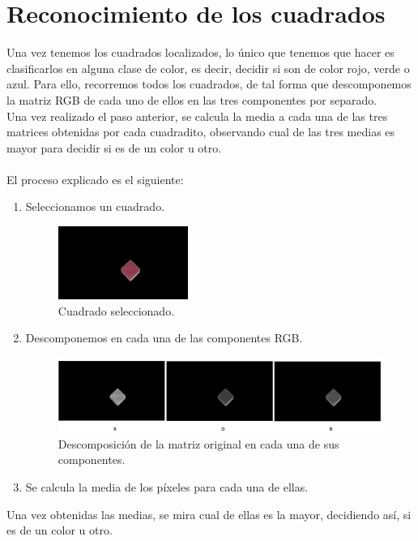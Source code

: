 \documentclass[11pt]{article}
\begin{document}
\section{Reconocimiento de los cuadrados}
Una vez tenemos los cuadrados localizados, lo único que tenemos que hacer es clasificarlos en alguna clase de color, es decir, decidir si son de color rojo, verde o azul. Para ello, recorremos todos los cuadrados, de tal forma que descomponemos la matriz RGB de cada uno de ellos en las tres componentes por separado.\\Una vez realizado el paso anterior, se calcula la media a cada una de las tres matrices obtenidas por cada cuadradito, observando cual de las tres medias es mayor para decidir si es de un color u otro.\\\\
El proceso explicado es el siguiente:
\begin{enumerate}
\item Seleccionamos un cuadrado.
\begin{figure}[h!]
  \centering
      \includegraphics[width=0.4\textwidth]{img_cd_rojo}
  \caption{Cuadrado seleccionado.}
\end{figure}
\newpage
\item Descomponemos en cada una de las componentes RGB.
\begin{figure}[h!]
  \centering
      \includegraphics[width=1\textwidth]{img_comp}
  \caption{Descomposición de la matriz original en cada una de sus componentes.}
\end{figure}

\item Se calcula la media de los píxeles para cada una de ellas.


\end{enumerate}

Una vez obtenidas las medias, se mira cual de ellas es la mayor, decidiendo así, si es de un color u otro.
\end{document}
